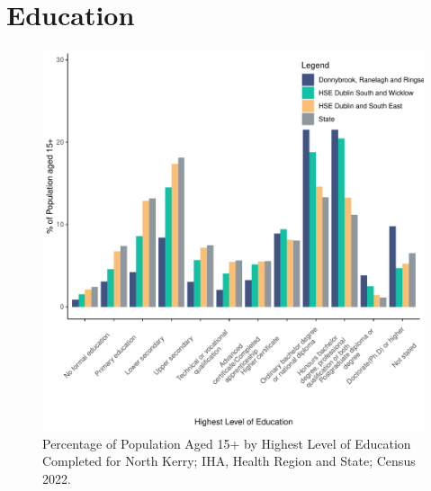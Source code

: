 \documentclass{article}
\begin{document}
\section{Education}\label{sect:Edu}
\begin{figure}[H]
	\centering
	\includegraphics[width = 120mm]{../figures/EduED.pdf}
	\caption{Percentage of Population Aged 15+ by Highest Level of Education Completed for North Kerry; IHA, Health Region and State; Census 2022.}
	\label{fig:vbnv}
	\end{figure}
\end{document}
